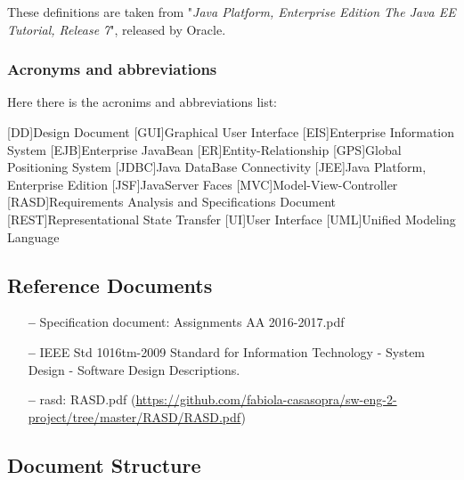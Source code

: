 These definitions are taken from "\textit{Java Platform, Enterprise Edition The Java EE Tutorial, Release 7}", released by Oracle.

\subsubsection{Acronyms and abbreviations } \label{acr}
Here there is the acronims and abbreviations list:

\begin{acronym}[DD] %

[DD]{Design Document}
[GUI]{Graphical User Interface}
[EIS]{Enterprise Information System}
[EJB]{Enterprise JavaBean}
[ER]{Entity-Relationship}
[GPS]{Global Positioning System}
[JDBC]{Java DataBase Connectivity}
[JEE]{Java Platform, Enterprise Edition}
[JSF]{JavaServer Faces}
[MVC]{Model-View-Controller}
[RASD]{Requirements Analysis and Specifications Document}
[REST]{Representational State Transfer}
[UI]{User Interface}
[UML]{Unified Modeling Language}

\end{acronym}

\subsection{Reference Documents} \label{ref-doc}

\begin{itemize}
\item[\textbf{--}] Specification document: Assignments AA 2016-2017.pdf
\item[\textbf{--}] IEEE Std 1016tm-2009 Standard for Information Technology - System Design - Software Design Descriptions.
\item[\textbf{--}] \acl{rasd}: RASD.pdf 
\newline
(\url{https://github.com/fabiola-casasopra/sw-eng-2-project/tree/master/RASD/RASD.pdf})
\end{itemize}

\subsection{Document Structure} \label{doc-struct}


